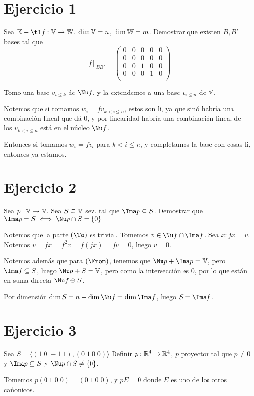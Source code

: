 \documentclass{article}
\begin{document}
\section{Ejercicio 1}
Sea $\K-\tl f: \V \to \W$. $\dim \mathbb{V} = n$, $\dim \mathbb{W} = m$. Demostrar que existen
$B, B'$ bases tal que
\[
	[f]_{BB'} = 
	\begin{pmatrix}
		0 & 0 & 0 & 0 & 0 \\
		0 & 0 & 0 & 0 & 0 \\
		0 & 0 & 1 & 0 & 0 \\
		0 & 0 & 0 & 1 & 0 \\
	\end{pmatrix}
\]

Tomo una base $v_{i \leq k}$ de $\Nu f$, y la extendemos a una base $v_{i \leq
n}$ de $\mathbb{V}$.

Notemos que si tomamos $w_i = f v_{k < i \leq n}$, estos son li, ya que sinó
habría una combinación lineal que dá 0, y por linearidad habría una combinación
lineal de los $v_{k < i \leq n}$ está en el núcleo $\Nu f$.

Entonces si tomamos $w_i = f v_i$ para $k < i \leq n$, y completamos la base
con cosas li, entonces ya estamos.

\section{Ejercicio 2}
Sea $p: \mathbb{V} \to \mathbb{V}$. Sea $S \subseteq \mathbb{V}$ sev. tal que $\Ima p \inn S$. Demostrar
que $\Ima p = S \iff \Nu p \cap S = \{0\}$

Notemos que la parte $(\To)$ es trivial. Tomemos $v \in \Nu f \cap \Ima f$.
Sea $x : fx = v$. Notemos $v = fx = f^2x = f(fx) = fv = 0$, luego $v = 0$.

Notemos además que para $(\From)$, tenemos que $\Nu p + \Ima p = \V$, pero
$\Ima f \inn S$, luego $\Nu p + S = \V$, pero como la intersección es $0$, por
lo que están en suma directa $\Nu f \oplus S$.

Por dimensión $\dim S = n - \dim \Nu f = \dim \Ima f$, luego $S = \Ima f$.

\section{Ejercicio 3}
Sea $S = \langle (1 \;0 \;-1 \;1), (0 \;1 \;0 \;0) \rangle$
Definir $p: \mathbb{R}^4 \to \mathbb{R}^4$, $p$ proyector tal que $p \neq 0$ y $\Ima p \inn S$
y $\Nu p \cap S \neq \{0\}$.

Tomemos $p (0\;1\;0\;0) = (0\;1\;0\;0)$, y $pE = 0$ donde $E$ es uno de los otros
cańonicos.
\end{document}

